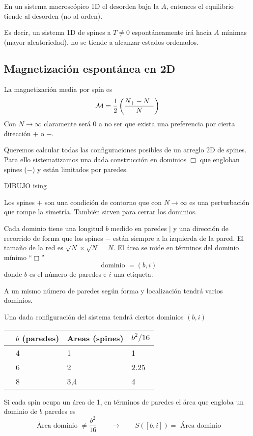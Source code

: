 \documentclass[10pt,oneside]{CBFT_book}
\begin{document}

En un sistema macroscópico 1D el desorden baja la $A$, entonces el equilibrio tiende
al desorden (no al orden).

Es decir, un sistema 1D de spines a $ T \neq 0 $ espontáneamente irá hacia $ A $
mínimas (mayor aleatoriedad), no se tiende a alcanzar estados ordenados.

\subsection{Magnetización espontánea en 2D}

La magnetización media por spín es
\[
	\mathcal{M} = \frac{1}{2} \left( \frac{ N_+ - N_- }{ N } \right)
\]
Con $N\to\infty$ claramente será 0 a no ser que exista una preferencia por cierta dirección $+$ o $-$.

Queremos calcular todas las configuraciones posibles de un arreglo 2D de spines.
Para ello sistematizamos una dada construcción en dominios $\Box$ que engloban spines ($-$) y están
limitados por paredes.

DIBUJO ising


Los spines $+$ son una condición de contorno que con $N\to\infty$ es una perturbación que rompe la
simetría. También sirven para cerrar los dominios.

Cada dominio tiene una longitud $b$ medido en paredes $|$ y una dirección de recorrido de forma que 
los spines $-$ están siempre a la izquierda de la pared.
El tamaño de la red es $\sqrt{N} \times \sqrt{N} = N$. El área se mide en términos del dominio 
mínimo ``$\Box$''
\[
	\text{ dominio } = (b,i)
\]
donde $b$ es el número de paredes e $i$ una etiqueta.

A un mismo número de paredes según forma y localización tendrá varios dominios.

Una dada configuración del sistema tendrá ciertos dominios $(b,i)$

\begin{center}
\begin{tabular}{llll}
 & $b$ (paredes) & Areas (spines) & $b^2/16$ \\
\hline
 & 4 & 1 & 1\\
 & 6 & 2 & 2.25\\
 & 8 & 3,4 & 4
\end{tabular}
\end{center}

Si cada spin ocupa un área de 1, en términos de paredes el área que engloba un dominio de $b$ paredes
es 
\[
	\text{ Área dominio } \neq \frac{b^2}{16} \qquad \rightarrow \qquad S([b,i]) = \text{ Área dominio}
\]
\end{document}
